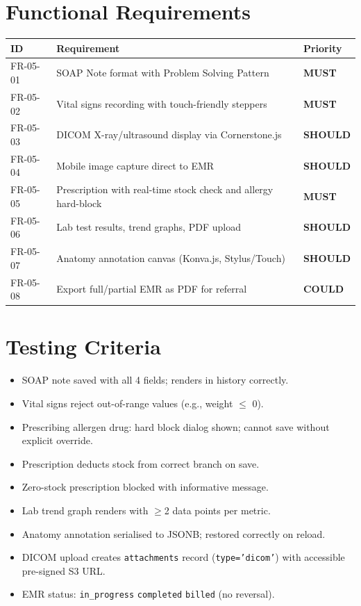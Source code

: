\documentclass[12pt,a4paper]{report}
\newcommand{\must}{\colorbox{red!15}{\color{errorred}\textbf{\small MUST}}}
\newcommand{\should}{\colorbox{orange!15}{\color{warnorange}\textbf{\small SHOULD}}}
\newcommand{\could}{\colorbox{green!10}{\color{successgreen}\textbf{\small COULD}}}
\newcommand{\testcheck}{\textcolor{successgreen}{\ding{51}}}
\begin{document}
\section{Functional Requirements}

\begin{longtable}{L{2.5cm} L{9cm} C{2cm}}
\toprule
\textbf{ID} & \textbf{Requirement} & \textbf{Priority} \\\midrule\endhead\bottomrule\endfoot
FR-05-01 & SOAP Note format with Problem Solving Pattern & \must \\
FR-05-02 & Vital signs recording with touch-friendly steppers & \must \\
FR-05-03 & DICOM X-ray/ultrasound display via Cornerstone.js & \should \\
FR-05-04 & Mobile image capture direct to EMR & \should \\
FR-05-05 & Prescription with real-time stock check and allergy hard-block & \must \\
FR-05-06 & Lab test results, trend graphs, PDF upload & \should \\
FR-05-07 & Anatomy annotation canvas (Konva.js, Stylus/Touch) & \should \\
FR-05-08 & Export full/partial EMR as PDF for referral & \could \\
\end{longtable}

\section{Testing Criteria}

\begin{itemize}
  \item[\testcheck] SOAP note saved with all 4 fields; renders in history correctly.
  \item[\testcheck] Vital signs reject out-of-range values (e.g., weight $\leq$ 0).
  \item[\testcheck] Prescribing allergen drug: hard block dialog shown; cannot save without explicit override.
  \item[\testcheck] Prescription deducts stock from correct branch on save.
  \item[\testcheck] Zero-stock prescription blocked with informative message.
  \item[\testcheck] Lab trend graph renders with $\geq$2 data points per metric.
  \item[\testcheck] Anatomy annotation serialised to JSONB; restored correctly on reload.
  \item[\testcheck] DICOM upload creates \texttt{attachments} record (\texttt{type='dicom'}) with accessible pre-signed S3 URL.
  \item[\testcheck] EMR status: \texttt{in\_progress} \textrightarrow{} \texttt{completed} \textrightarrow{} \texttt{billed} (no reversal).
\end{itemize}
\end{document}

